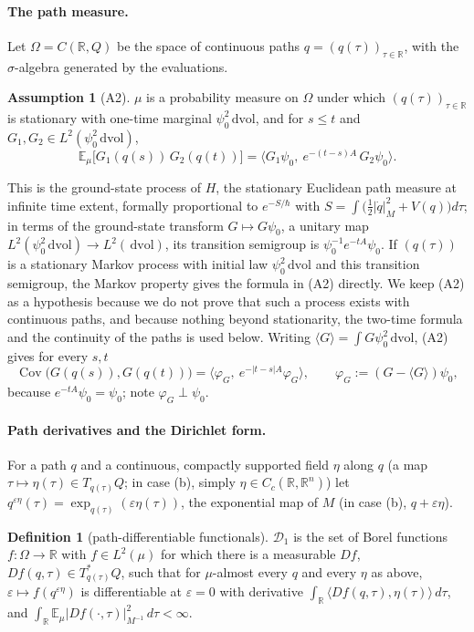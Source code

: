 \documentclass[11pt,a4paper]{article}
\theoremstyle{definition}
\newtheorem{definition}[theorem]{Definition}
\newtheorem{assumption}[theorem]{Assumption}
\theoremstyle{remark}
\newcommand{\E}{\mathbb{E}}
\newcommand{\R}{\mathbb{R}}
\newcommand{\Cov}{\operatorname{Cov}}
\newcommand{\cD}{\mathcal{D}}
\newcommand{\dvol}{\,\mathrm{dvol}}
\begin{document}
\paragraph{The path measure.}
Let $\Omega=C(\R,Q)$ be the space of continuous paths $q=(q(\tau))_{\tau\in\R}$, with the $\sigma$-algebra generated by the evaluations.

\begin{assumption}[A2]\label{ass:A2}
$\mu$ is a probability measure on $\Omega$ under which $(q(\tau))_{\tau\in\R}$ is stationary with one-time marginal $\psi_0^2\dvol$, and for $s\le t$ and $G_1,G_2\in L^2(\psi_0^2\dvol)$,
\[
  \E_\mu\bigl[G_1(q(s))\,G_2(q(t))\bigr]=\bigl\langle G_1\psi_0,\ e^{-(t-s)A}\,G_2\psi_0\bigr\rangle .
\]
\end{assumption}

This is the ground-state process of $H$, the stationary Euclidean path measure at infinite time extent, formally proportional to $e^{-S/\hbar}$ with $S=\int\bigl(\tfrac12|\dot q|_M^2+V(q)\bigr)d\tau$; in terms of the ground-state transform $G\mapsto G\psi_0$, a unitary map $L^2(\psi_0^2\dvol)\to L^2(\dvol)$, its transition semigroup is $\psi_0^{-1}e^{-tA}\psi_0$.
If $(q(\tau))$ is a stationary Markov process with initial law $\psi_0^2\dvol$ and this transition semigroup, the Markov property gives the formula in (A2) directly.
We keep (A2) as a hypothesis because we do not prove that such a process exists with continuous paths, and because nothing beyond stationarity, the two-time formula and the continuity of the paths is used below.
Writing $\langle G\rangle=\int G\psi_0^2\dvol$, (A2) gives for every $s,t$
\begin{equation}\label{eq:cov}
  \Cov\bigl(G(q(s)),G(q(t))\bigr)=\bigl\langle\varphi_G,\ e^{-|t-s|A}\varphi_G\bigr\rangle,\qquad \varphi_G:=(G-\langle G\rangle)\psi_0 ,
\end{equation}
because $e^{-tA}\psi_0=\psi_0$; note $\varphi_G\perp\psi_0$.

\paragraph{Path derivatives and the Dirichlet form.}
For a path $q$ and a continuous, compactly supported field $\eta$ along $q$ (a map $\tau\mapsto\eta(\tau)\in T_{q(\tau)}Q$; in case (b), simply $\eta\in C_c(\R,\R^n)$) let $q^{\varepsilon\eta}(\tau)=\exp_{q(\tau)}(\varepsilon\eta(\tau))$, the exponential map of $M$ (in case (b), $q+\varepsilon\eta$).

\begin{definition}[path-differentiable functionals]\label{def:D1}
$\cD_1$ is the set of Borel functions $f:\Omega\to\R$ with $f\in L^2(\mu)$ for which there is a measurable $Df$, $Df(q,\tau)\in T^*_{q(\tau)}Q$, such that for $\mu$-almost every $q$ and every $\eta$ as above, $\varepsilon\mapsto f(q^{\varepsilon\eta})$ is differentiable at $\varepsilon=0$ with derivative $\int_\R\langle Df(q,\tau),\eta(\tau)\rangle\,d\tau$, and $\int_\R\E_\mu|Df(\cdot,\tau)|^2_{M^{-1}}\,d\tau<\infty$.
\end{definition}
\end{document}
